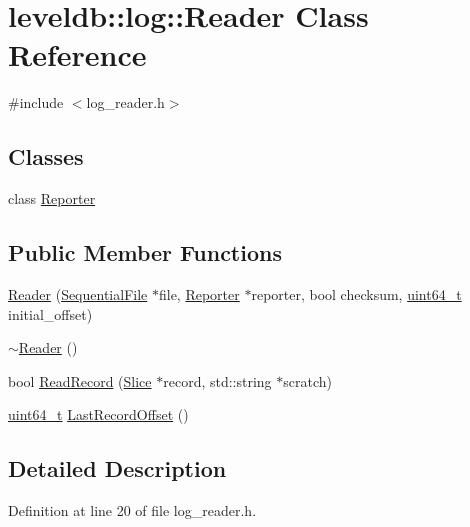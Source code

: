 \hypertarget{classleveldb_1_1log_1_1_reader}{}\section{leveldb\+:\+:log\+:\+:Reader Class Reference}
\label{classleveldb_1_1log_1_1_reader}


{\ttfamily \#include $<$log\+\_\+reader.\+h$>$}

\subsection*{Classes}
\begin{DoxyCompactItemize}
\item 
class \hyperlink{classleveldb_1_1log_1_1_reader_1_1_reporter}{Reporter}
\end{DoxyCompactItemize}
\subsection*{Public Member Functions}
\begin{DoxyCompactItemize}
\item 
\hyperlink{classleveldb_1_1log_1_1_reader_a38c1a9988741af5429dad60cf79f0556}{Reader} (\hyperlink{classleveldb_1_1_sequential_file}{Sequential\+File} $\ast$file, \hyperlink{classleveldb_1_1log_1_1_reader_1_1_reporter}{Reporter} $\ast$reporter, bool checksum, \hyperlink{stdint_8h_aaa5d1cd013383c889537491c3cfd9aad}{uint64\+\_\+t} initial\+\_\+offset)
\item 
\hyperlink{classleveldb_1_1log_1_1_reader_a52bc3896f8a0baee92f8c699553e7841}{$\sim$\+Reader} ()
\item 
bool \hyperlink{classleveldb_1_1log_1_1_reader_a84059598c9367cb677a9d70d77993282}{Read\+Record} (\hyperlink{classleveldb_1_1_slice}{Slice} $\ast$record, std\+::string $\ast$scratch)
\item 
\hyperlink{stdint_8h_aaa5d1cd013383c889537491c3cfd9aad}{uint64\+\_\+t} \hyperlink{classleveldb_1_1log_1_1_reader_a358c5545069d86a61948ac0a021aa7f6}{Last\+Record\+Offset} ()
\end{DoxyCompactItemize}


\subsection{Detailed Description}


Definition at line 20 of file log\+\_\+reader.\+h.



